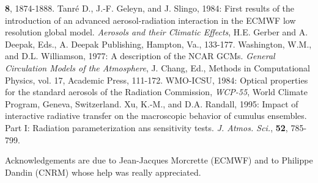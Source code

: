       {\bf 8},
      1874-1888.
\decrefname
Tanr\'e D., J.-F. Geleyn, and J. Slingo, 1984:
      First results of the introduction of an advanced aerosol-radiation
      interaction in the ECMWF low resolution global model.
      {\it Aerosols and their Climatic Effects},
      H.E. Gerber and A. Deepak, Eds., A. Deepak Publishing, Hampton, Va.,
      133-177.
\decrefname
Washington, W.M., and D.L. Williamson, 1977:
      A description of the NCAR GCMs.
      {\it General Circulation Models of the Atmosphere},
      J. Chang, Ed., Methods in Computational Physics, vol. 17, Academic Press,
      111-172.
\decrefname
WMO-ICSU, 1984:
      Optical properties for the standard aerosols of the Radiation Commission,
      {\it WCP-55},
      World Climate Program, Geneva, Switzerland.
\decrefname
Xu, K.-M., and D.A. Randall, 1995:
      Impact of interactive radiative transfer on the macroscopic behavior of
      cumulus ensembles. Part I: Radiation parameterization ans sensitivity
      tests.
      {\it J. Atmos. Sci.},
      {\bf 52},
      785-799.

\vskip 1cm
\noindent Acknowledgements are due to Jean-Jacques Morcrette (ECMWF) and to
Philippe Dandin (CNRM) whose help was really appreciated.



%

